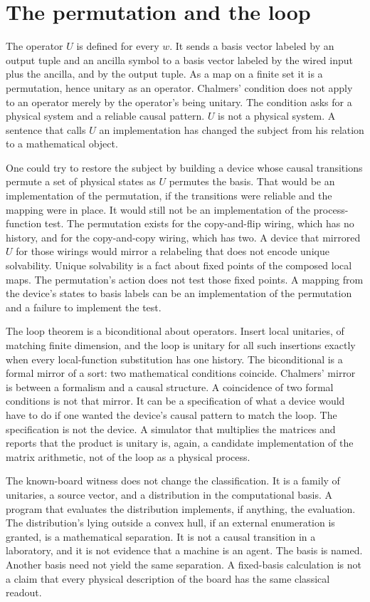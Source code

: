 \documentclass[11pt]{article}
\begin{document}
\section{The permutation and the loop}
\label{sec:U}

The operator \(U\) is defined for every \(w\). It sends a basis vector labeled by an output tuple and an ancilla symbol to a basis vector labeled by the wired input plus the ancilla, and by the output tuple. As a map on a finite set it is a permutation, hence unitary as an operator. Chalmers' condition does not apply to an operator merely by the operator's being unitary. The condition asks for a physical system and a reliable causal pattern. \(U\) is not a physical system. A sentence that calls \(U\) an implementation has changed the subject from his relation to a mathematical object.

One could try to restore the subject by building a device whose causal transitions permute a set of physical states as \(U\) permutes the basis. That would be an implementation of the permutation, if the transitions were reliable and the mapping were in place. It would still not be an implementation of the process-function test. The permutation exists for the copy-and-flip wiring, which has no history, and for the copy-and-copy wiring, which has two. A device that mirrored \(U\) for those wirings would mirror a relabeling that does not encode unique solvability. Unique solvability is a fact about fixed points of the composed local maps. The permutation's action does not test those fixed points. A mapping from the device's states to basis labels can be an implementation of the permutation and a failure to implement the test.

The loop theorem is a biconditional about operators. Insert local unitaries, of matching finite dimension, and the loop is unitary for all such insertions exactly when every local-function substitution has one history. The biconditional is a formal mirror of a sort: two mathematical conditions coincide. Chalmers' mirror is between a formalism and a causal structure. A coincidence of two formal conditions is not that mirror. It can be a specification of what a device would have to do if one wanted the device's causal pattern to match the loop. The specification is not the device. A simulator that multiplies the matrices and reports that the product is unitary is, again, a candidate implementation of the matrix arithmetic, not of the loop as a physical process.

The known-board witness does not change the classification. It is a family of unitaries, a source vector, and a distribution in the computational basis. A program that evaluates the distribution implements, if anything, the evaluation. The distribution's lying outside a convex hull, if an external enumeration is granted, is a mathematical separation. It is not a causal transition in a laboratory, and it is not evidence that a machine is an agent. The basis is named. Another basis need not yield the same separation. A fixed-basis calculation is not a claim that every physical description of the board has the same classical readout.
\end{document}
